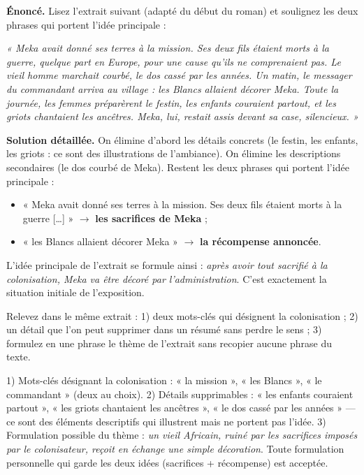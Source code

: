 \documentclass[11pt]{article}
\begin{document}
\begin{exoresolu}
\textbf{Énoncé.} Lisez l'extrait suivant (adapté du début du roman) et soulignez les deux phrases qui portent l'idée principale :

\emph{« Meka avait donné ses terres à la mission. Ses deux fils étaient morts à la guerre, quelque part en Europe, pour une cause qu'ils ne comprenaient pas. Le vieil homme marchait courbé, le dos cassé par les années. Un matin, le messager du commandant arriva au village : les Blancs allaient décorer Meka. Toute la journée, les femmes préparèrent le festin, les enfants couraient partout, et les griots chantaient les ancêtres. Meka, lui, restait assis devant sa case, silencieux. »}

\tcblower
\textbf{Solution détaillée.} On élimine d'abord les détails concrets (le festin, les enfants, les griots : ce sont des illustrations de l'ambiance). On élimine les descriptions secondaires (le dos courbé de Meka). Restent les deux phrases qui portent l'idée principale :

\begin{itemize}
\item « Meka avait donné ses terres à la mission. Ses deux fils étaient morts à la guerre [\dots] » $\rightarrow$ \textbf{les sacrifices de Meka} ;
\item « les Blancs allaient décorer Meka » $\rightarrow$ \textbf{la récompense annoncée}.
\end{itemize}

L'idée principale de l'extrait se formule ainsi : \emph{après avoir tout sacrifié à la colonisation, Meka va être décoré par l'administration}. C'est exactement la situation initiale de l'exposition.
\end{exoresolu}

\begin{exercice}
Relevez dans le même extrait : 1) deux mots-clés qui désignent la colonisation ; 2) un détail que l'on peut supprimer dans un résumé sans perdre le sens ; 3) formulez en une phrase le thème de l'extrait sans recopier aucune phrase du texte.
\end{exercice}

\begin{corrige}
1) Mots-clés désignant la colonisation : « la mission », « les Blancs », « le commandant » (deux au choix). 2) Détails supprimables : « les enfants couraient partout », « les griots chantaient les ancêtres », « le dos cassé par les années » — ce sont des éléments descriptifs qui illustrent mais ne portent pas l'idée. 3) Formulation possible du thème : \emph{un vieil Africain, ruiné par les sacrifices imposés par le colonisateur, reçoit en échange une simple décoration}. Toute formulation personnelle qui garde les deux idées (sacrifices + récompense) est acceptée.
\end{corrige}
\end{document}
